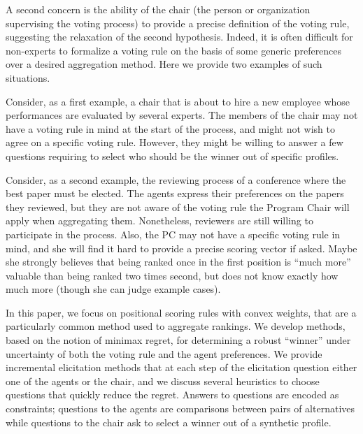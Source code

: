 \documentclass[runningheads]{llncs}
\theoremstyle{remark}
\begin{document}
A second concern is the ability of the chair (the person or organization supervising the voting process) to provide a precise definition of the voting rule, suggesting the relaxation of the second hypothesis. Indeed, it is often difficult for non-experts to formalize a voting rule on the basis of some generic preferences over a desired aggregation method. 
Here we provide two examples of such situations.

Consider, as a first example, a chair that is about to hire a new employee whose performances are evaluated by several experts. The members of the chair may not have a voting rule in mind at the start of the process, and might not wish to agree on a specific voting rule. However, they might be willing to answer a few questions requiring to select who should be the winner out of specific profiles. 

Consider, as a second example, the reviewing process of a conference where the best paper must be elected. The agents express their preferences on the papers they reviewed, but they are not aware of the voting rule the Program Chair will apply when aggregating them. Nonetheless, reviewers are still willing to participate in the process. Also, the PC may not have a specific voting rule in mind, and she will find it hard to provide a precise scoring vector if asked. Maybe she strongly believes that being ranked once in the first position is “much more” valuable than being ranked two times second, but does not know exactly how much more (though she can judge example cases).

In this paper, we focus on positional scoring rules with convex weights, that are a particularly common method used to aggregate rankings. 
We develop methods, based on the notion of minimax regret, for determining a robust ``winner'' under uncertainty of both the voting rule and the agent preferences.
We provide incremental elicitation methods that 
at each step of the elicitation question either one of the agents or the chair, and we discuss several heuristics to choose questions that quickly reduce the regret. 
Answers to questions are encoded as constraints; questions to the agents are comparisons between pairs of alternatives while
questions to the chair ask to select a winner out of a synthetic profile.
\end{document}
